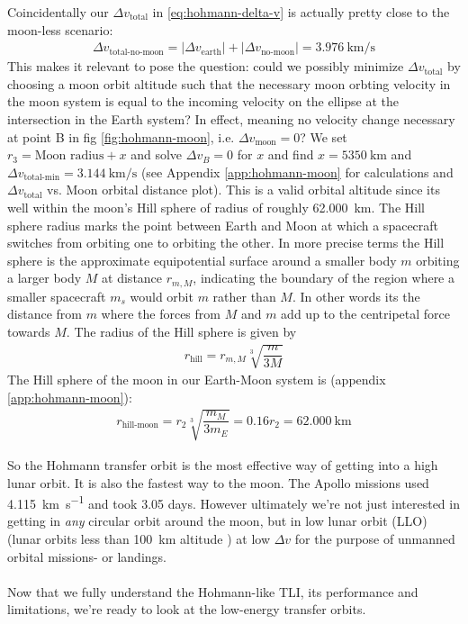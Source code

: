 Coincidentally our $\Delta v_{\text{total}}$ in \ref{eq:hohmann-delta-v} is actually pretty close to the moon-less scenario:
\begin{align}
\Delta v_{\text{total-no-moon}} = |\Delta v_{\text{earth}}| + |\Delta v_{\text{no-moon}}| = \SI{3.976}{\km\per\s}
\end{align}
This makes it relevant to pose the question: could we possibly minimize $\Delta v_{\text{total}}$ by choosing a moon orbit altitude such that the necessary moon orbting velocity in the moon system is equal to the incoming velocity on the ellipse at the intersection in the Earth system? In effect, meaning no velocity change necessary at point B in fig \ref{fig:hohmann-moon}, i.e. $\Delta v_{\text{moon}} = 0$? We set $r_3 = \text{Moon radius} + x$ and solve $\Delta v_B = 0$ for $x$ and find $x = \SI{5350}{\km}$ and $\Delta v_\text{total-min} = \SI{3.144}{\km\per\second}$ (see Appendix \ref{app:hohmann-moon} for calculations and $\Delta v_\text{total}$ vs. Moon orbital distance plot). This is a valid orbital altitude since its well within the moon's Hill sphere of radius of roughly \SI{62,000}{\km}. The Hill sphere radius marks the point between Earth and Moon at which a spacecraft switches from orbiting one to orbiting the other. In more precise terms the Hill sphere is the approximate equipotential surface around a smaller body $m$ orbiting a larger body $M$ at distance $r_{m,M}$, indicating the boundary of the region where a smaller spacecraft $m_s$ would orbit $m$ rather than $M$. In other words its the distance from $m$ where the forces from $M$ and $m$ add up to the centripetal force towards $M$. The radius of the Hill sphere is given by \cite{Murray1999}
\begin{align}
r_{\text{hill}} = r_{m,M}\sqrt[3]{\dfrac{m}{3M}} \label{eq:hill-sphere}
\end{align}
The Hill sphere of the moon in our Earth-Moon system is (appendix \ref{app:hohmann-moon}):
\begin{align}
r_{\text{hill-moon}} = r_2\sqrt[3]{\dfrac{m_M}{3m_E}} = 0.16 r_2 = \SI{62,000}{\km}
\end{align}

So the Hohmann transfer orbit is the most effective way of getting into a high lunar orbit. It is also the fastest way to the moon. The Apollo missions used \SI{4.115}{\km\per\s} and took 3.05 days. However ultimately we're not just interested in getting in \emph{any} circular orbit around the moon, but in low lunar orbit (LLO) (lunar orbits less than \SI{100}{\km} altitude \cite{NASA1966}) at low $\Delta v$ for the purpose of unmanned orbital missions- or landings.\\
\\
Now that we fully understand the Hohmann-like TLI, its performance and limitations, we're ready to look at the low-energy transfer orbits.


